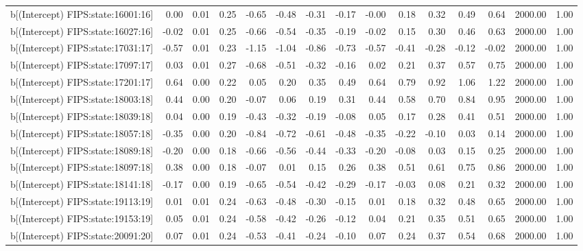 \begin{table}[ht]
\begin{tabular}{rrrrrrrrrrrrrrr}
  b[(Intercept) FIPS:state:16001:16] & 0.00 & 0.01 & 0.25 & -0.65 & -0.48 & -0.31 & -0.17 & -0.00 & 0.18 & 0.32 & 0.49 & 0.64 & 2000.00 & 1.00 \\ 
  b[(Intercept) FIPS:state:16027:16] & -0.02 & 0.01 & 0.25 & -0.66 & -0.54 & -0.35 & -0.19 & -0.02 & 0.15 & 0.30 & 0.46 & 0.63 & 2000.00 & 1.00 \\ 
  b[(Intercept) FIPS:state:17031:17] & -0.57 & 0.01 & 0.23 & -1.15 & -1.04 & -0.86 & -0.73 & -0.57 & -0.41 & -0.28 & -0.12 & -0.02 & 2000.00 & 1.00 \\ 
  b[(Intercept) FIPS:state:17097:17] & 0.03 & 0.01 & 0.27 & -0.68 & -0.51 & -0.32 & -0.16 & 0.02 & 0.21 & 0.37 & 0.57 & 0.75 & 2000.00 & 1.00 \\ 
  b[(Intercept) FIPS:state:17201:17] & 0.64 & 0.00 & 0.22 & 0.05 & 0.20 & 0.35 & 0.49 & 0.64 & 0.79 & 0.92 & 1.06 & 1.22 & 2000.00 & 1.00 \\ 
  b[(Intercept) FIPS:state:18003:18] & 0.44 & 0.00 & 0.20 & -0.07 & 0.06 & 0.19 & 0.31 & 0.44 & 0.58 & 0.70 & 0.84 & 0.95 & 2000.00 & 1.00 \\ 
  b[(Intercept) FIPS:state:18039:18] & 0.04 & 0.00 & 0.19 & -0.43 & -0.32 & -0.19 & -0.08 & 0.05 & 0.17 & 0.28 & 0.41 & 0.51 & 2000.00 & 1.00 \\ 
  b[(Intercept) FIPS:state:18057:18] & -0.35 & 0.00 & 0.20 & -0.84 & -0.72 & -0.61 & -0.48 & -0.35 & -0.22 & -0.10 & 0.03 & 0.14 & 2000.00 & 1.00 \\ 
  b[(Intercept) FIPS:state:18089:18] & -0.20 & 0.00 & 0.18 & -0.66 & -0.56 & -0.44 & -0.33 & -0.20 & -0.08 & 0.03 & 0.15 & 0.25 & 2000.00 & 1.00 \\ 
  b[(Intercept) FIPS:state:18097:18] & 0.38 & 0.00 & 0.18 & -0.07 & 0.01 & 0.15 & 0.26 & 0.38 & 0.51 & 0.61 & 0.75 & 0.86 & 2000.00 & 1.00 \\ 
  b[(Intercept) FIPS:state:18141:18] & -0.17 & 0.00 & 0.19 & -0.65 & -0.54 & -0.42 & -0.29 & -0.17 & -0.03 & 0.08 & 0.21 & 0.32 & 2000.00 & 1.00 \\ 
  b[(Intercept) FIPS:state:19113:19] & 0.01 & 0.01 & 0.24 & -0.63 & -0.48 & -0.30 & -0.15 & 0.01 & 0.18 & 0.32 & 0.48 & 0.65 & 2000.00 & 1.00 \\ 
  b[(Intercept) FIPS:state:19153:19] & 0.05 & 0.01 & 0.24 & -0.58 & -0.42 & -0.26 & -0.12 & 0.04 & 0.21 & 0.35 & 0.51 & 0.65 & 2000.00 & 1.00 \\ 
  b[(Intercept) FIPS:state:20091:20] & 0.07 & 0.01 & 0.24 & -0.53 & -0.41 & -0.24 & -0.10 & 0.07 & 0.24 & 0.37 & 0.54 & 0.68 & 2000.00 & 1.00 \\ 

\end{tabular}
\end{table}
